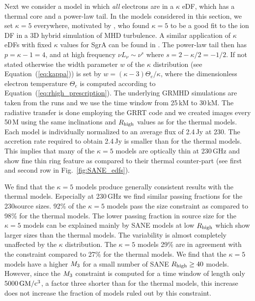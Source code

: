 Next we consider a model in which {\em all} electrons are in a $\kappa$ eDF, which has a thermal core and a power-law tail.
In the models considered in this section, we set $\kappa = 5$ everywhere,  motivated by \cite{2016PhRvL.117w5101K}, who found $\kappa = 5$ to be a good fit to the ion DF in a 3D hybrid simulation of MHD turbulence.
A similar application of $\kappa$ eDFs with fixed $\kappa$ values for SgrA can be found in \citet{davelaar2018}.
The power-law tail then has $p = \kappa - 1 = 4$, and at high frequency $\nu L_\nu \sim \nu^s$ where $s = 2 - \kappa/2 = -1/2$.
{If not stated otherwise the width parameter $w$ of the $\kappa$ distribution (see Equation~(\ref{eq:kappa})) is set by $w = (\kappa - 3) \Theta_e/\kappa$, where the dimensionless electron temperature $\Theta_e$ is computed according to Equation~(\ref{eq:rhigh_prescription}).
The underlying GRMHD simulations are taken from the \bhac runs and we use the time window from 25\,kM to 30\,kM.
The radiative transfer is done employing the GRRT code \bhoss \citep{Younsi2012,Younsi2020} and we created images every 50\,M using the same inclinations and $R_\mathrm{high}$ values as for the thermal models.
Each model is individually normalized to an average flux of 2.4\,Jy at 230\GHz.} The accretion rate required to obtain 2.4\,Jy is smaller than for the thermal models.
This implies that many of the $\kappa=5$ models are optically thin at 230\,GHz and show fine thin ring feature as compared to their thermal counter-part (see first and second row in Fig.~\ref{fig:SANE_edfs}).


We find that the $\kappa=5$ models produce generally consistent results with the \bhac thermal models.
Especially at 230\,GHz we find similar passing fractions for the 230\GHz source sizes.
92\% of the $\kappa=5$ models pass the size constraint as compared to 98\% for the thermal models.
The lower passing fraction in source size for the $\kappa=5$ models can be explained mainly by SANE models at low $R_\mathrm{high}$ which show larger sizes than the thermal models.
The variability is almost completely unaffected by the $\kappa$ distribution.
The $\kappa=5$ models 29\% are in agreement with the constraint compared to 27\% for the thermal models.
We find that the $\kappa=5$ models have a higher $M_{3}$ for a small number of SANE $R_{\rm high}\geq 40$ models.
However, since the $M_{3}$ constraint is computed for a time window of length only 5000\,$\rm{GM/c^3}$, a factor three shorter than for the thermal models, this increase does not increase the fraction of models ruled out by this constraint.

